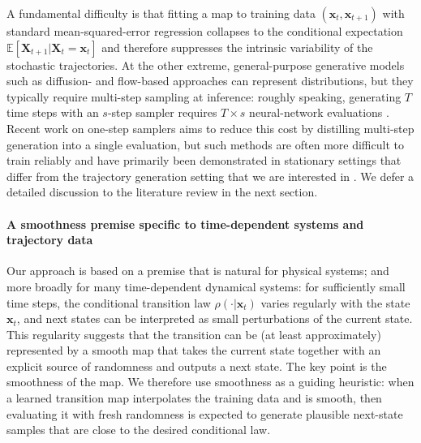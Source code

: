 \documentclass{article}
\theoremstyle{plain}
\theoremstyle{definition}
\theoremstyle{remark}
\newcommand{\x}{\bm{x}}
\newcommand{\X}{\bm{X}}
\begin{document}
A fundamental difficulty is that fitting a map to training data  $(\x_t, \x_{t + 1})$ with standard mean-squared-error regression collapses to the conditional expectation $\mathbb{E}[\X_{t + 1} | \X_t = \x_t]$ and therefore suppresses the intrinsic variability of the stochastic trajectories. At the other extreme, general-purpose generative models such as diffusion- and flow-based approaches can represent distributions, but they typically require multi-step sampling at inference: roughly speaking, generating $T$ time steps with an $s$-step sampler requires $T \times s$ neural-network evaluations \cite{chen2024probabilistic,KOHL2026108641}. Recent work on one-step samplers aims to reduce this cost by distilling multi-step generation into a single evaluation, but such methods are often more difficult to train reliably and have primarily been demonstrated in stationary settings that differ from the trajectory generation setting that we are interested in \cite{song2023consistency,zhou2025inductivemomentmatching,geng2025mean,boffi2025how}. We defer a detailed discussion to the literature review in the next section.

\vspace*{-0.2cm}\paragraph{A smoothness premise specific to time-dependent systems and trajectory data}
Our approach is based on a premise that is natural for physical systems; and more broadly for many time-dependent dynamical systems: for sufficiently small time steps, the conditional transition law $\rho(\cdot | \x_t)$ varies regularly with the state $\x_t$, and next states can be interpreted as small perturbations of the current state.
This regularity suggests that the transition can be (at least approximately) represented by a smooth map that takes the current state together with an explicit source of randomness and outputs a next state. The key point is the smoothness of the map. We therefore use smoothness as a guiding heuristic: when a learned transition map interpolates the training data and is smooth, then evaluating it with fresh randomness is expected to generate plausible next-state samples that are close to the desired conditional law.
\end{document}
